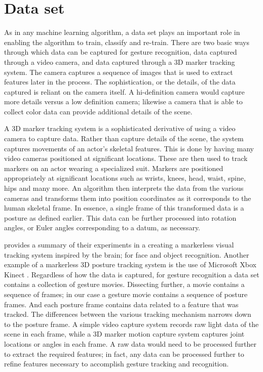 \documentclass[]{report}   %
\begin{document}
\section{Data set}
As in any machine learning algorithm, a data set plays an important role in enabling the algorithm to train, classify and re-train. There are two basic ways through which data can be captured for gesture recognition, data captured through a video camera, and data captured through a 3D marker tracking system\cite{dmcoll}. The camera captures a sequence of images that is used to extract features later in the process. The sophistication, or the details, of the data captured is reliant on the camera itself. A hi-definition camera would capture more details versus a low definition camera; likewise a camera that is able to collect color data can provide additional details of the scene.

A 3D marker tracking system is a sophisticated derivative of using a video camera to capture data. Rather than capture details of the scene, the system captures movements of an actor's skeletal features. This is done by having many video cameras positioned at significant locations. These are then used to track markers on an actor wearing a specialized suit. Markers are positioned appropriately at significant locations such as wrists, knees, head, waist, spine, hips and many more. An algorithm then interprets the data from the various cameras and transforms them into position coordinates as it corresponds to the human skeletal frame. In essence, a single frame of this transformed data is a posture as defined earlier. This data can be further processed into rotation angles, or Euler angles corresponding to a datum, as necessary.

\citet{Morie200731} provides a summary of their experiments in a creating a markerless visual tracking system inspired by the brain; for face and object recognition. Another example of a markerless 3D posture tracking system is the use of Microsoft Xbox Kinect \cite{Kar_2010}. Regardless of how the data is captured, for gesture recognition a data set contains a collection of gesture movies. Dissecting further, a movie contains a sequence of frames; in our case a gesture movie contains a sequence of posture frames. And each posture frame contains data related to a feature that was tracked. The differences between the various tracking mechanism narrows down to the posture frame. A simple video capture system records raw light data of the scene in each frame, while a 3D marker motion capture system captures joint locations or angles in each frame. A raw data would need to be processed further to extract the required features; in fact, any data can be processed further to refine features necessary to accomplish gesture tracking and recognition. 
\end{document}
